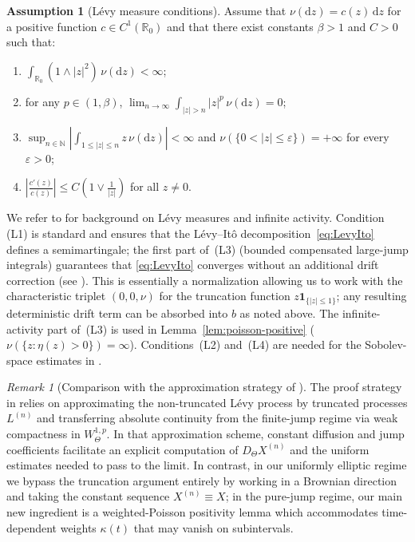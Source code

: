 \documentclass[11pt]{article}
\newcommand{\R}{\mathbb{R}}
\newcommand{\1}{\mathbf{1}}
\newcommand{\dd}{\mathrm{d}}
\theoremstyle{plain}
\theoremstyle{definition}
\newtheorem{assumption}[theorem]{Assumption}
\theoremstyle{remark}
\newtheorem{remark}[theorem]{Remark}
\begin{document}
\begin{assumption}[L\'evy measure conditions]\label{ass:Levy}
Assume that $\nu(\dd z)=c(z)\,\dd z$ for a positive function $c\in C^1(\R_0)$ and that there exist constants $\beta>1$ and $C>0$
such that:
\begin{enumerate}[label=(L\arabic*),leftmargin=2.7em]
\item $\displaystyle \int_{\R_0} (1\wedge |z|^2)\,\nu(\dd z)<\infty$;
\item for any $p\in(1,\beta)$, $\displaystyle \lim_{n\to\infty}\int_{|z|>n}|z|^{p}\,\nu(\dd z)=0$;
\item $\displaystyle \sup_{n\in\mathbb{N}}\left|\int_{1\le |z|\le n} z\,\nu(\dd z)\right|<\infty$ and
$\nu(\{0<|z|\le \varepsilon\})=+\infty$ for every $\varepsilon>0$;
\item $\displaystyle \left|\frac{c'(z)}{c(z)}\right|\le C\left(1\vee \frac1{|z|}\right)$ for all $z\ne 0$.
\end{enumerate}
We refer to \cite{Sato2013} for background on L\'evy measures and infinite activity.
Condition (L1) is standard and ensures that the L\'evy--It\^o decomposition~\eqref{eq:LevyIto}
defines a semimartingale; the first part of~(L3) (bounded compensated large-jump integrals) guarantees
that \eqref{eq:LevyIto} converges without an additional drift correction
(see \cite[Theorem~19.2]{Sato2013}).
This is essentially a normalization allowing us to work with the characteristic triplet $(0,0,\nu)$
for the truncation function $z\1_{\{|z|\le 1\}}$; any resulting deterministic drift term can be absorbed into $b$ as noted above.
The infinite-activity part of~(L3) is used
in Lemma~\ref{lem:poisson-positive} ($\nu(\{z:\eta(z)>0\})=\infty$).
Conditions~(L2) and~(L4) are needed for
the Sobolev-space estimates in \cite{NakagawaSuzuki2024}.
\end{assumption}

\begin{remark}[Comparison with the approximation strategy of {\cite{NakagawaSuzuki2024}}]
The proof strategy in \cite{NakagawaSuzuki2024} relies on approximating the non-truncated L\'evy process by truncated processes $L^{(n)}$
and transferring absolute continuity from the finite-jump regime via weak compactness in $W^{1,p}_\Theta$.
In that approximation scheme, constant diffusion and jump coefficients facilitate an explicit computation of $D_\Theta X^{(n)}$
and the uniform estimates needed to pass to the limit.
In contrast, in our uniformly elliptic regime we bypass the truncation argument entirely by working in a Brownian direction and taking the
constant sequence $X^{(n)}\equiv X$; in the pure-jump regime, our main new ingredient is a weighted-Poisson positivity lemma which accommodates
time-dependent weights $\kappa(t)$ that may vanish on subintervals.
\end{remark}
\end{document}
